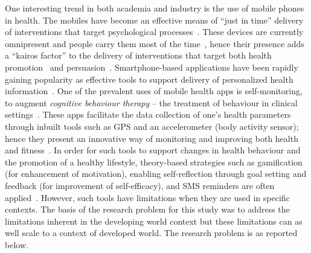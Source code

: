 One interesting trend in both academia and industry is the use of mobile phones in health. The mobiles have become an effective means of ``just in time'' delivery of interventions that target psychological processes~\citep{hsu2014persuasive}. These devices are currently omnipresent and people carry them most of the time~\citep{mattila2008mobile}, hence their presence adds a ``kairos factor'' to the delivery of interventions that target both health promotion~\citep{pollak2010s} and persuasion~\citep{hsu2014persuasive}. Smartphone-based applications have been rapidly gaining popularity as effective tools to support delivery of personalized health information~\citep{handel2011mhealth}. One of the prevalent uses of mobile health apps is self-monitoring, to augment \emph{cognitive behaviour therapy} -- the treatment of behaviour in clinical settings~\citep{mattila2008mobile,medynskiy2010salud}. These apps facilitate the data collection of one's health parameters through inbuilt tools such as GPS and an accelerometer (body activity sensor); hence they present an innovative way of monitoring and improving both health and fitness~\citep{higgins2016smartphone}. In order for such tools to support changes in health behaviour and the promotion of a healthy lifestyle, theory-based strategies such as gamification (for enhancement of motivation), enabling self-reflection through goal setting and feedback (for improvement of self-efficacy), and SMS reminders are often applied~\citep{consolvo2009goal,cole2010text,hamari2014persuasive,hamari2014does,higgins2016smartphone}. However, such tools have limitations when they are used in specific contexts. The basis of the research problem for this study was to address the limitations inherent in the developing world context but these limitations can as well scale to a context of developed world. The research problem is as reported below.
